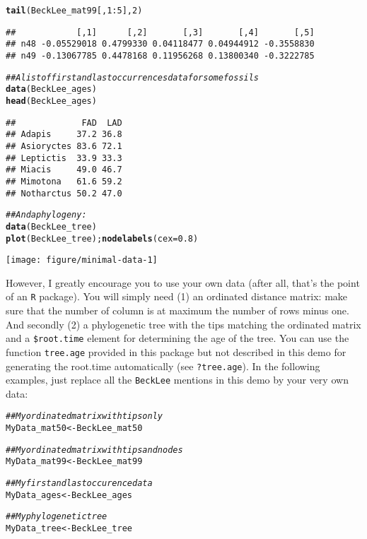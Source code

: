 \documentclass{article}\usepackage[]{graphicx}\usepackage[]{color}
\makeatletter
\newcommand{\hlnum}[1]{\textcolor[rgb]{0.686,0.059,0.569}{#1}}%
\newcommand{\hlcom}[1]{\textcolor[rgb]{0.678,0.584,0.686}{\textit{#1}}}%
\newcommand{\hlopt}[1]{\textcolor[rgb]{0,0,0}{#1}}%
\newcommand{\hlstd}[1]{\textcolor[rgb]{0.345,0.345,0.345}{#1}}%
\newcommand{\hlkwb}[1]{\textcolor[rgb]{0.69,0.353,0.396}{#1}}%
\newcommand{\hlkwc}[1]{\textcolor[rgb]{0.333,0.667,0.333}{#1}}%
\newcommand{\hlkwd}[1]{\textcolor[rgb]{0.737,0.353,0.396}{\textbf{#1}}}%
\newenvironment{kframe}{%
 \def\at@end@of@kframe{}%
 \ifinner\ifhmode%
  \def\at@end@of@kframe{\end{minipage}}%
  \begin{minipage}{\columnwidth}%
 \fi\fi%
 \def\FrameCommand##1{\hskip\@totalleftmargin \hskip-\fboxsep
 \colorbox{shadecolor}{##1}\hskip-\fboxsep
     \hskip-\linewidth \hskip-\@totalleftmargin \hskip\columnwidth}%
 \MakeFramed {\advance\hsize-\width
   \@totalleftmargin\z@ \linewidth\hsize
   \@setminipage}}%
 {\par\unskip\endMakeFramed%
 \at@end@of@kframe}
\newenvironment{knitrout}{}{} %
\newcommand{\R}{\texttt{R} }
\makeatother
\begin{document}
\begin{knitrout}
\begin{kframe}
\begin{alltt}
\hlkwd{tail}\hlstd{(BeckLee_mat99[,}\hlnum{1}\hlopt{:}\hlnum{5}\hlstd{],} \hlnum{2}\hlstd{)}
\end{alltt}
\begin{verbatim}
##            [,1]      [,2]       [,3]       [,4]       [,5]
## n48 -0.05529018 0.4799330 0.04118477 0.04944912 -0.3558830
## n49 -0.13067785 0.4478168 0.11956268 0.13800340 -0.3222785
\end{verbatim}
\begin{alltt}
\hlcom{## A list of first and last occurrences data for some fossils}
\hlkwd{data}\hlstd{(BeckLee_ages)}
\hlkwd{head}\hlstd{(BeckLee_ages)}
\end{alltt}
\begin{verbatim}
##             FAD  LAD
## Adapis     37.2 36.8
## Asioryctes 83.6 72.1
## Leptictis  33.9 33.3
## Miacis     49.0 46.7
## Mimotona   61.6 59.2
## Notharctus 50.2 47.0
\end{verbatim}
\begin{alltt}
\hlcom{## And a phylogeny:}
\hlkwd{data}\hlstd{(BeckLee_tree)}
\hlkwd{plot}\hlstd{(BeckLee_tree) ;} \hlkwd{nodelabels}\hlstd{(}\hlkwc{cex}\hlstd{=}\hlnum{0.8}\hlstd{)}
\end{alltt}
\end{kframe}

{\centering \texttt{[image: figure/minimal-data-1]} 

}



\end{knitrout}

However, I greatly encourage you to use your own data (after all, that's the point of an \R package).
You will simply need (1) an ordinated distance matrix: make sure that the number of column is at maximum the number of rows minus one.
And secondly (2) a phylogenetic tree with the tips matching the ordinated matrix and a \texttt{\$root.time} element for determining the age of the tree.
You can use the function \texttt{tree.age} provided in this package but not described in this demo for generating the root.time automatically (see \texttt{?tree.age}).
In the following examples, just replace all the \texttt{BeckLee} mentions in this demo by your very own data:

\begin{knitrout}
\color{fgcolor}\begin{kframe}
\begin{alltt}
\hlcom{## My ordinated matrix with tips only}
\hlstd{MyData_mat50} \hlkwb{<-} \hlstd{BeckLee_mat50}

\hlcom{## My ordinated matrix with tips and nodes}
\hlstd{MyData_mat99} \hlkwb{<-} \hlstd{BeckLee_mat99}

\hlcom{## My first and last occurence data}
\hlstd{MyData_ages} \hlkwb{<-} \hlstd{BeckLee_ages}

\hlcom{## My phylogenetic tree}
\hlstd{MyData_tree} \hlkwb{<-} \hlstd{BeckLee_tree}
\end{alltt}
\end{kframe}
\end{knitrout}
\end{document}
